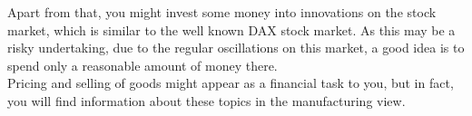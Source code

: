 \documentclass[11pt,titlepage,oneside,openany]{book}
\begin{document}
Apart from that, you might invest some money into innovations on the stock market, which is similar to the well known DAX stock market. As this may be a risky undertaking, due to the regular oscillations on this market, a good idea is to spend only a reasonable amount of money there. \\
%

Pricing and selling of goods might appear as a financial task to you, but in fact, you will find information about these topics in the manufacturing view.\\ 

\end{document}
